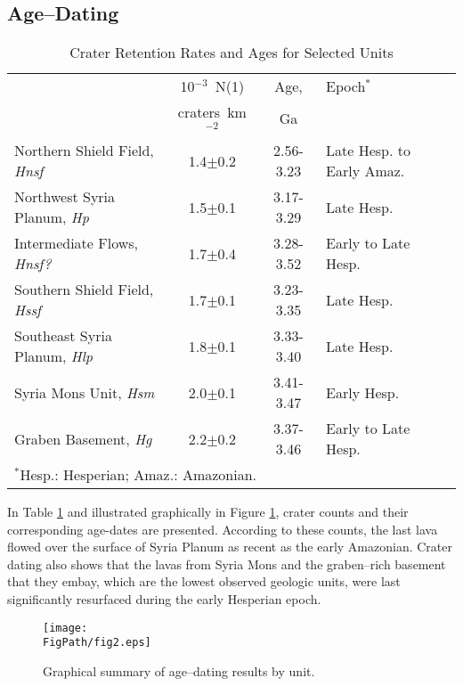\subsection{Age--Dating}
\label{sec:resultsAgeDating}

\begin{table}
\centering
\caption{Crater Retention Rates and Ages for Selected Units}
\label{tab-crater}
\begin{tabular}{l c c l}
	\toprule
  & 10$^{-3}$~N(1) & Age, & Epoch$^*$\\
  & craters~km$^{-2}$ & Ga &\\
  \midrule
  Northern Shield Field, \textit{Hnsf} & 1.4$\pm$0.2 & 2.56-3.23 & Late Hesp. to Early Amaz. \\
  Northwest Syria Planum, \textit{Hp} & 1.5$\pm$0.1 & 3.17-3.29 & Late Hesp. \\
  Intermediate Flows, \textit{Hnsf?} & 1.7$\pm$0.4 & 3.28-3.52 & Early to Late Hesp. \\
  Southern Shield Field, \textit{Hssf} & 1.7$\pm$0.1 & 3.23-3.35 & Late Hesp. \\
  Southeast Syria Planum, \textit{Hlp} & 1.8$\pm$0.1 & 3.33-3.40 & Late Hesp. \\
  Syria Mons Unit, \textit{Hsm} & 2.0$\pm$0.1 & 3.41-3.47 & Early Hesp. \\
  Graben Basement, \textit{Hg} & 2.2$\pm$0.2 & 3.37-3.46 & Early to Late Hesp.\\
	\bottomrule
	\multicolumn{4}{p{0.95\linewidth}}{$^*$Hesp.: Hesperian; Amaz.: Amazonian.}
\end{tabular}
\end{table}

In Table \ref{tab-crater} and illustrated graphically in Figure \ref{fig-unitages}, crater counts and their corresponding age-dates are presented. According to these counts, the last lava flowed over the surface of Syria Planum as recent as the early Amazonian. Crater dating also shows that the lavas from Syria Mons and the graben--rich basement that they embay, which are the lowest observed geologic units, were last significantly resurfaced during the early Hesperian epoch.

\begin{figure}
\centering
\texttt{[image: \\FigPath/fig2.eps]}
\caption{Graphical summary of age--dating results by unit.}
\label{fig-unitages}
\end{figure}

